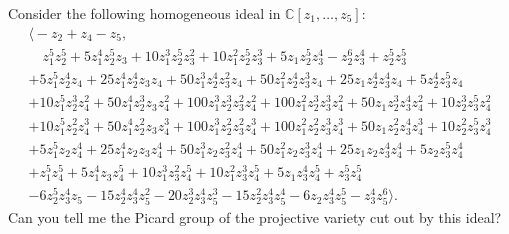 Consider the following homogeneous ideal in $\mathbb{C}[z_1,\dots,z_5]$:
\begin{multline*}
\bigl\langle -z_{2}+z_{4}-z_{5},\\
\quad z_{1}^{5}z_{2}^{5}+5z_{1}^{4}z_{2}^{5}z_{3}+10z_{1}^{3}z_{2}^{5}z_{3}^{2}+10z_{1}^{2}z_{2}^{5}z_{3}^{3}+5z_{1}z_{2}^{5}z_{3}^{4}-z_{2}^{6}z_{3}^{4}+z_{2}^{5}z_{3}^{5}\\
+5z_{1}^{5}z_{2}^{4}z_{4}+25z_{1}^{4}z_{2}^{4}z_{3}z_{4}+50z_{1}^{3}z_{2}^{4}z_{3}^{2}z_{4}+50z_{1}^{2}z_{2}^{4}z_{3}^{3}z_{4}+25z_{1}z_{2}^{4}z_{3}^{4}z_{4}+5z_{2}^{4}z_{3}^{5}z_{4}\\
+10z_{1}^{5}z_{2}^{3}z_{4}^{2}+50z_{1}^{4}z_{2}^{3}z_{3}z_{4}^{2}+100z_{1}^{3}z_{2}^{3}z_{3}^{2}z_{4}^{2}+100z_{1}^{2}z_{2}^{3}z_{3}^{3}z_{4}^{2}+50z_{1}z_{2}^{3}z_{3}^{4}z_{4}^{2}+10z_{2}^{3}z_{3}^{5}z_{4}^{2}\\
+10z_{1}^{5}z_{2}^{2}z_{4}^{3}+50z_{1}^{4}z_{2}^{2}z_{3}z_{4}^{3}+100z_{1}^{3}z_{2}^{2}z_{3}^{2}z_{4}^{3}+100z_{1}^{2}z_{2}^{2}z_{3}^{3}z_{4}^{3}+50z_{1}z_{2}^{2}z_{3}^{4}z_{4}^{3}+10z_{2}^{2}z_{3}^{5}z_{4}^{3}\\
+5z_{1}^{5}z_{2}z_{4}^{4}+25z_{1}^{4}z_{2}z_{3}z_{4}^{4}+50z_{1}^{3}z_{2}z_{3}^{2}z_{4}^{4}+50z_{1}^{2}z_{2}z_{3}^{3}z_{4}^{4}+25z_{1}z_{2}z_{3}^{4}z_{4}^{4}+5z_{2}z_{3}^{5}z_{4}^{4}\\
+z_{1}^{5}z_{4}^{5}+5z_{1}^{4}z_{3}z_{4}^{5}+10z_{1}^{3}z_{3}^{2}z_{4}^{5}+10z_{1}^{2}z_{3}^{3}z_{4}^{5}+5z_{1}z_{3}^{4}z_{4}^{5}+z_{3}^{5}z_{4}^{5}\\
-6z_{2}^{5}z_{3}^{4}z_{5}-15z_{2}^{4}z_{3}^{4}z_{5}^{2}-20z_{2}^{3}z_{3}^{4}z_{5}^{3}-15z_{2}^{2}z_{3}^{4}z_{5}^{4}-6z_{2}z_{3}^{4}z_{5}^{5}-z_{3}^{4}z_{5}^{6}\bigr\rangle.
\end{multline*}
Can you tell me the Picard group of the projective variety cut out by this ideal?
